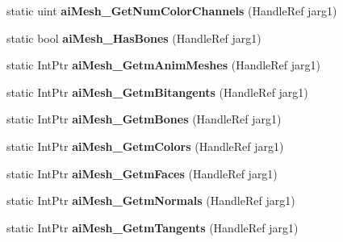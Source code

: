 \begin{DoxyCompactItemize}
\item 
\hypertarget{class_assimp_p_i_n_v_o_k_e_a2fd43f84e34990449e0e2a81b7fa7919}{static uint {\bfseries ai\+Mesh\+\_\+\+Get\+Num\+Color\+Channels} (Handle\+Ref jarg1)}\label{class_assimp_p_i_n_v_o_k_e_a2fd43f84e34990449e0e2a81b7fa7919}

\item 
\hypertarget{class_assimp_p_i_n_v_o_k_e_a9b5024d71906d32049259b1b1d9e0c37}{static bool {\bfseries ai\+Mesh\+\_\+\+Has\+Bones} (Handle\+Ref jarg1)}\label{class_assimp_p_i_n_v_o_k_e_a9b5024d71906d32049259b1b1d9e0c37}

\item 
\hypertarget{class_assimp_p_i_n_v_o_k_e_a4530ad83d2d7b4e1036dd63bed61e204}{static Int\+Ptr {\bfseries ai\+Mesh\+\_\+\+Getm\+Anim\+Meshes} (Handle\+Ref jarg1)}\label{class_assimp_p_i_n_v_o_k_e_a4530ad83d2d7b4e1036dd63bed61e204}

\item 
\hypertarget{class_assimp_p_i_n_v_o_k_e_aa23518a44ed79d372e5a4c4972df7563}{static Int\+Ptr {\bfseries ai\+Mesh\+\_\+\+Getm\+Bitangents} (Handle\+Ref jarg1)}\label{class_assimp_p_i_n_v_o_k_e_aa23518a44ed79d372e5a4c4972df7563}

\item 
\hypertarget{class_assimp_p_i_n_v_o_k_e_a32604a496d54488b087ac70104f792fa}{static Int\+Ptr {\bfseries ai\+Mesh\+\_\+\+Getm\+Bones} (Handle\+Ref jarg1)}\label{class_assimp_p_i_n_v_o_k_e_a32604a496d54488b087ac70104f792fa}

\item 
\hypertarget{class_assimp_p_i_n_v_o_k_e_a6f8749648b2e7b5ebbf134132f4466c7}{static Int\+Ptr {\bfseries ai\+Mesh\+\_\+\+Getm\+Colors} (Handle\+Ref jarg1)}\label{class_assimp_p_i_n_v_o_k_e_a6f8749648b2e7b5ebbf134132f4466c7}

\item 
\hypertarget{class_assimp_p_i_n_v_o_k_e_a859570ae064b8630ee2a6071dd7093a5}{static Int\+Ptr {\bfseries ai\+Mesh\+\_\+\+Getm\+Faces} (Handle\+Ref jarg1)}\label{class_assimp_p_i_n_v_o_k_e_a859570ae064b8630ee2a6071dd7093a5}

\item 
\hypertarget{class_assimp_p_i_n_v_o_k_e_ac6f92ef654951bba8f517e7787f0f18f}{static Int\+Ptr {\bfseries ai\+Mesh\+\_\+\+Getm\+Normals} (Handle\+Ref jarg1)}\label{class_assimp_p_i_n_v_o_k_e_ac6f92ef654951bba8f517e7787f0f18f}

\item 
\hypertarget{class_assimp_p_i_n_v_o_k_e_a3312892d200a82a7cf02ed966627929b}{static Int\+Ptr {\bfseries ai\+Mesh\+\_\+\+Getm\+Tangents} (Handle\+Ref jarg1)}\label{class_assimp_p_i_n_v_o_k_e_a3312892d200a82a7cf02ed966627929b}


\end{DoxyCompactItemize}
